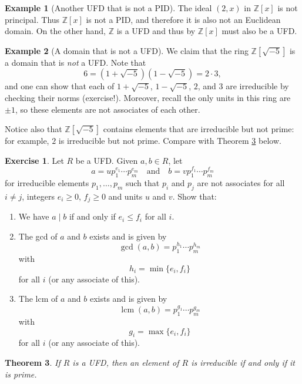 \documentclass[12pt]{report}
\newtheorem{theorem}{Theorem}[chapter]
\numberwithin{equation}{section}
\numberwithin{theorem}{chapter}
\theoremstyle{definition}
\newtheorem{example}[theorem]{Example}
\newtheorem{exercise}{Exercise}
\newtheorem*{basic properties}{Basic Properties}
\newtheorem*{Important Remark}{Important Remark}
\DeclareMathOperator{\lcm}{lcm}
\begin{document}
\begin{example}[Another UFD that is not a PID]
The ideal $(2,x)$ in $\mathbb{Z}[x]$ is not principal. Thus $\mathbb{Z}[x]$ is not a PID, and therefore it is also not an Euclidean domain. On the other hand, $\mathbb{Z}$ is a UFD and thus by  $\mathbb{Z}[x]$ must also be a UFD.
\end{example}


\begin{example}[A domain that is not a UFD]
We claim that the ring $\mathbb{Z}[\sqrt{-5}]$ is a domain that is {\em not} a UFD. Note that 
$$6=(1 + \sqrt{-5}) (1 - \sqrt{-5})=2\cdot 3,$$ 
and one can show that each of $1 + \sqrt{-5}$, $1 - \sqrt{-5}$, $2$, and $3$ are irreducible by checking their norms (exercise!). 
Moreover, recall the only units in this ring are $\pm 1$, so these elements are not associates of each other. 

Notice also that $\mathbb{Z}[\sqrt{-5}]$ contains elements that are irreducible but not prime: for example, $2$ is irreducible but not prime. Compare with Theorem
\ref{ufd irreducible=prime} below. 
\end{example}



\begin{exercise} 
Let $R$ be a UFD. Given $a, b \in R$, let
$$a = up_1^{e_1} \cdots p_m^{e_m} \quad \text{and} \quad b = vp_1^{f_1} \cdots p_m^{f_m}$$ 
for irreducible elements $p_1, \dots, p_m$ such that $p_i$ and $p_j$ are not associates for all $i \neq j$, integers $e_i \geqslant 0$, $f_j \geqslant 0$ and units $u$ and $v$. Show that:
\begin{enumerate}
\item We have $a \mid b$ if and only if $e_i \leqslant f_i$ for all $i$.
\item The gcd of $a$ and $b$ exists and is given by 
$$\gcd(a,b) = p_1^{h_1} \cdots p_m^{h_m}$$
with 
$$h_i = \min \{e_i, f_i\}$$ 
for all $i$ (or any associate of this).
\item The lcm of $a$ and $b$ exists and is given by
$$\lcm(a,b) = p_1^{g_1} \cdots p_m^{g_m}$$ 
with 
$$g_i = \max \{ e_i, f_i \}$$ 
for all $i$ (or any associate of this).    
\end{enumerate}
\end{exercise}





\begin{theorem}\label{ufd irreducible=prime}
If $R$ is a UFD, then an element of $R$ is irreducible if and only if it is prime.
\end{theorem}
\end{document}
